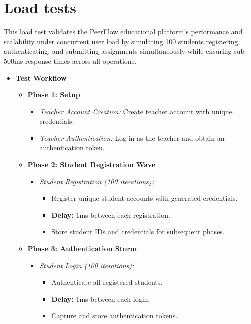 \section{Load tests}

\begin{justify}
    This load test validates the PeerFlow educational platform's performance and scalability under concurrent user load by simulating 100 students registering, authenticating, and submitting assignments simultaneously while ensuring sub-500ms response times across all operations.
\end{justify}

\begin{itemize}
    \item \textbf{Test Workflow}
    \begin{itemize}
        \item \textbf{Phase 1: Setup}
        \begin{itemize}
            \item \textit{Teacher Account Creation:} Create teacher account with unique credentials.
            \item \textit{Teacher Authentication:} Log in as the teacher and obtain an authentication token.
        \end{itemize}

        \item \textbf{Phase 2: Student Registration Wave}
        \begin{itemize}
            \item \textit{Student Registration (100 iterations):}
            \begin{itemize}
                \item Register unique student accounts with generated credentials.
                \item \textbf{Delay:} 1ms between each registration.
                \item Store student IDs and credentials for subsequent phases.
            \end{itemize}
        \end{itemize}

        \item \textbf{Phase 3: Authentication Storm}
        \begin{itemize}
            \item \textit{Student Login (100 iterations):}
            \begin{itemize}
                \item Authenticate all registered students.
                \item \textbf{Delay:} 1ms between each login.
                \item Capture and store authentication tokens.
            \end{itemize}
        \end{itemize}


\end{itemize}
\end{itemize}
